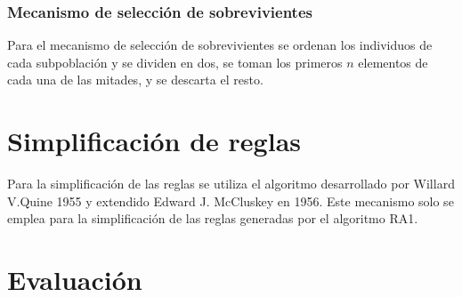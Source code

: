 \subsubsection{Mecanismo de selección de sobrevivientes}

Para el mecanismo de selección de sobrevivientes se ordenan los individuos de cada subpoblación y se dividen en dos, se toman los primeros $n$ elementos de cada una de las mitades, y se descarta el resto.

\section{Simplificación de reglas}

Para la simplificación de las reglas se utiliza el algoritmo desarrollado por Willard V.Quine 1955 y extendido Edward J. McCluskey  en 1956. Este mecanismo solo se emplea para la simplificación de las reglas generadas por el algoritmo RA1.


\section{Evaluación}
